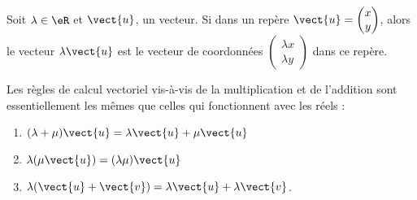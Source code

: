\begin{definition}
    Soit \( \lambda\in \eR\) et \( \vect{ u }\), un vecteur. Si dans un repère \( \vect{ u }=\begin{pmatrix}
        x    \\ 
        y    
    \end{pmatrix}\), alors le vecteur \( \lambda\vect{ u }\) est le vecteur de coordonnées \( \begin{pmatrix}
        \lambda x    \\ 
        \lambda y    
    \end{pmatrix}\) dans ce repère.
\end{definition}

\begin{Aretenir}
    Les règles de calcul vectoriel vis-à-vis de la multiplication et de l'addition sont essentiellement les mêmes que celles qui fonctionnent avec les réels :
    \begin{enumerate}
        \item
            \( (\lambda+\mu)\vect{ u }=\lambda\vect{ u }+\mu\vect{ u }\)
        \item
            \( \lambda(\mu\vect{ u })=(\lambda\mu)\vect{ u }\)
        \item
            \( \lambda(\vect{ u }+\vect{ v })=\lambda\vect{ u }+\lambda\vect{ v }\).
    \end{enumerate}
\end{Aretenir}
